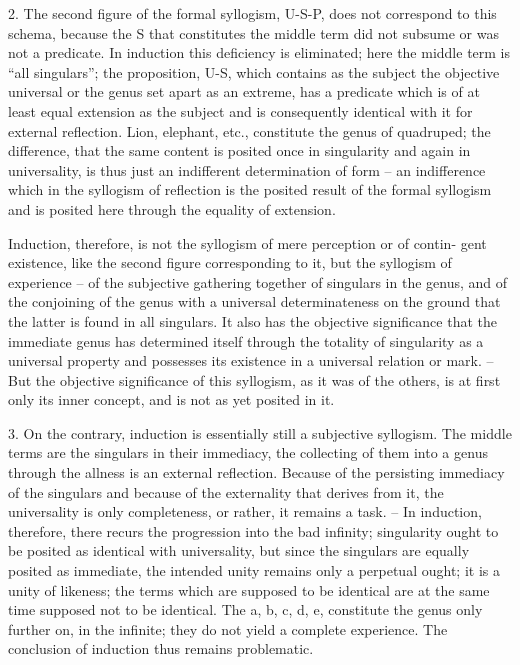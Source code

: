 2. The second figure of the formal syllogism, U-S-P, does not correspond
to this schema, because the S that constitutes the middle term did not
subsume or was not a predicate. In induction this deficiency is eliminated;
here the middle term is “all singulars”; the proposition, U-S, which contains
as the subject the objective universal or the genus set apart as an extreme,
has a predicate which is of at least equal extension as the subject and is
consequently identical with it for external reflection. Lion, elephant, etc.,
constitute the genus of quadruped; the difference, that the same content
is posited once in singularity and again in universality, is thus just an
indifferent determination of form – an indifference which in the syllogism
of reflection is the posited result of the formal syllogism and is posited here
through the equality of extension.

Induction, therefore, is not the syllogism of mere perception or of contin-
gent existence, like the second figure corresponding to it, but the syllogism
of experience – of the subjective gathering together of singulars in the genus,
and of the conjoining of the genus with a universal determinateness on
the ground that the latter is found in all singulars. It also has the objective
significance that the immediate genus has determined itself through the
totality of singularity as a universal property and possesses its existence
in a universal relation or mark. – But the objective significance of this
syllogism, as it was of the others, is at first only its inner concept, and is
not as yet posited in it.

3. On the contrary, induction is essentially still a subjective syllogism.
The middle terms are the singulars in their immediacy, the collecting of
them into a genus through the allness is an external reflection. Because of
the persisting immediacy of the singulars and because of the externality that
derives from it, the universality is only completeness, or rather, it remains
a task. – In induction, therefore, there recurs the progression into the bad
infinity; singularity ought to be posited as identical with universality, but
since the singulars are equally posited as immediate, the intended unity
remains only a perpetual ought; it is a unity of likeness; the terms which are
supposed to be identical are at the same time supposed not to be identical.
The a, b, c, d, e, constitute the genus only further on, in the infinite;
they do not yield a complete experience. The conclusion of induction thus
remains problematic.


